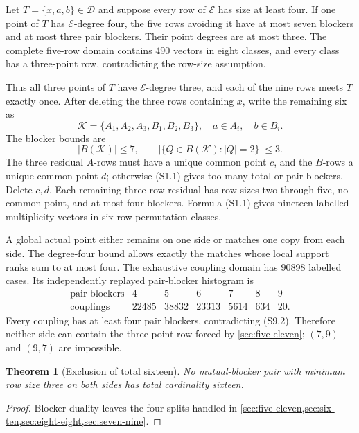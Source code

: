 \documentclass[11pt,a4paper]{article}
\newtheorem{theorem}{Theorem}[section]
\theoremstyle{definition}
\newcommand{\blocker}{B}
\begin{document}
Let $T=\{x,a,b\}\in\mathcal D$ and suppose every row of $\mathcal E$ has
size at least four.  If one point of $T$ has $\mathcal E$-degree four, the
five rows avoiding it have at most seven blockers and at most three pair
blockers.  Their point degrees are at most three.  The complete five-row
domain contains 490 vectors in eight classes, and every class has a
three-point row, contradicting the row-size assumption.

Thus all three points of $T$ have $\mathcal E$-degree three, and each of the
nine rows meets $T$ exactly once.  After deleting the three rows containing
$x$, write the remaining six as
\[
 \mathcal K=\{A_1,A_2,A_3,B_1,B_2,B_3\},
 \quad a\in A_i,\quad b\in B_i.
\]
The blocker bounds are
\[
 |\blocker(\mathcal K)|\leq7,\qquad
 |\{Q\in\blocker(\mathcal K):|Q|=2\}|\leq3.                \tag{S9.2}
\]
The three residual $A$-rows must have a unique common point $c$, and the
$B$-rows a unique common point $d$; otherwise (S1.1) gives too many total or
pair blockers.  Delete $c,d$.  Each remaining three-row residual has row
sizes two through five, no common point, and at most four blockers.  Formula
(S1.1) gives nineteen labelled multiplicity vectors in six row-permutation
classes.

A global actual point either remains on one side or matches one copy from
each side.  The degree-four bound allows exactly the matches whose local
support ranks sum to at most four.  The exhaustive coupling domain has 90898
labelled cases.  Its independently replayed pair-blocker histogram is
\[
\begin{array}{c|rrrrrr}
\text{pair blockers}&4&5&6&7&8&9\\
\hline
\text{couplings}&22485&38832&23313&5614&634&20.
\end{array}                                                   \tag{S9.3}
\]
Every coupling has at least four pair blockers, contradicting (S9.2).
Therefore neither side can contain the three-point row forced by
\cref{sec:five-eleven}; $(7,9)$ and $(9,7)$ are impossible.

\begin{theorem}[Exclusion of total sixteen]
\label{thm:middle-sixteen}
No mutual-blocker pair with minimum row size three on both sides has total
cardinality sixteen.
\end{theorem}

\begin{proof}
Blocker duality leaves the four splits handled in
\cref{sec:five-eleven,sec:six-ten,sec:eight-eight,sec:seven-nine}.
\end{proof}
\end{document}
